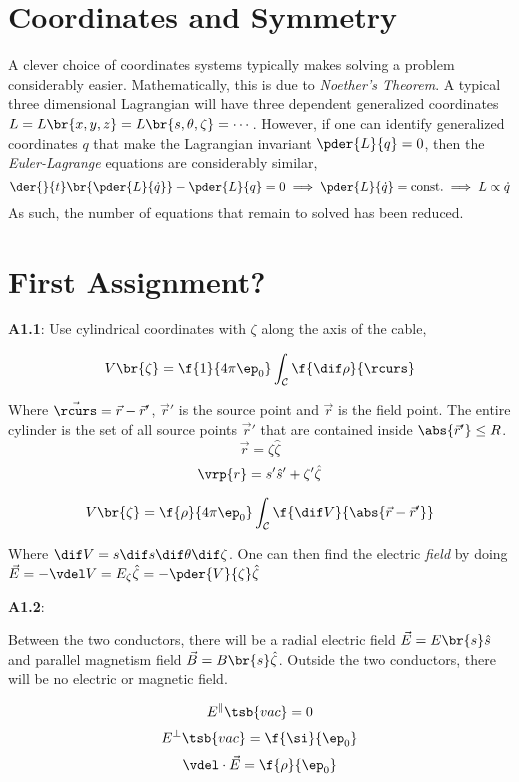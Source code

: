 \documentclass{article}
\begin{document}
\titlePage

\tableOfContents

\disclaimer

\section{Coordinates and Symmetry}

A clever choice of coordinates systems typically makes solving a problem considerably easier. Mathematically, this is due to \textit{Noether's Theorem}. A typical three dimensional Lagrangian will have three dependent generalized coordinates $L = L \br{x,y,z} = L \br{s,\theta,\zeta} = \cdots$. However, if one can identify generalized coordinates $q$ that make the Lagrangian invariant $\pder{L}{q} = 0$, then the \textit{Euler-Lagrange} equations are considerably similar,
\[ \der{}{t}\br{\pder{L}{\dot{q}}} - \pder{L}{q} = 0 \implies \pder{L}{\dot{q}} = \textrm{const.} \implies L \propto \dot{q} \]
As such, the number of equations that remain to solved has been reduced.

\section{First Assignment?}

\textbf{A1.1}: Use cylindrical coordinates with $\zeta$ along the axis of the cable,

\[ V\br{\zeta} = \f{1}{4 \pi \ep_0} \int_{\mathcal{C}}\f{\dif \rho}{\rcurs} \]

Where $\vec{\rcurs} = \vec{r} - \vec{r}'$, $\vec{r}'$ is the source point and $\vec{r}$ is the field point. The entire cylinder is the set of all source points $\vec{r}'$ that are contained inside $\abs{\vec{r}'} \leq R$.
\[ \vec{r} = \zeta \hat{\zeta} \]
\[ \vrp{r} = s' \hat{s}' + \zeta' \hat{\zeta} \]

\[ V\br{\zeta} = \f{\rho}{4 \pi \ep_0} \int_{\mathcal{C}}\f{\dif V}{\abs{\vec{r} - \vec{r}'}} \]

Where $ \dif V = s \dif s \dif \theta \dif \zeta$. One can then find the electric \textit{field} by doing $\vec{E} = - \vdel V = E_{\zeta} \hat{\zeta} = -\pder{V}{\zeta} \hat{\zeta}$

\textbf{A1.2}:

Between the two conductors, there will be a radial electric field $\vec{E} = E\br{s} \hat{s}$ and parallel magnetism field $\vec{B} = B\br{s} \hat{\zeta} $. Outside the two conductors, there will be no electric or magnetic field.

\[ E^{\parallel}\tsb{vac} = 0 \]
\[ E^{\perp}\tsb{vac} = \f{\si}{\ep_0} \]
\[ \vdel \cdot \vec{E} = \f{\rho}{\ep_0} \]

\end{document}
